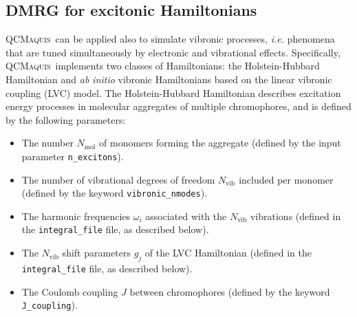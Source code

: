\documentclass[bibliography=totoc,12pt,a4paper]{scrartcl}
\newcommand{\qcm}{\textsc{QCMaquis}}
\begin{document}
%
%

\subsection{DMRG for excitonic Hamiltonians}
\label{sec:excitonic}

\qcm\ can be applied also to simulate vibronic processes, \textit{i.e.} phenomena that are tuned simultaneously by electronic and vibrational effects.
Specifically, \qcm\ implements two classes of Hamiltonians: the Holstein-Hubbard Hamiltonian and \textit{ab initio} vibronic Hamiltonians based on the linear vibronic coupling (LVC) model.
The Holstein-Hubbard Hamiltonian describes excitation energy processes in molecular aggregates of multiple chromophores, and is defined by the following parameters:

\begin{itemize}
  \item The number $N_\text{mol}$ of monomers forming the aggregate (defined by the input parameter \texttt{n\_excitons}).
  \item The number of vibrational degrees of freedom $N_\text{vib}$ included per monomer (defined by the keyword \texttt{vibronic\_nmodes}).
  \item The harmonic frequencies $\omega_i$ associated with the $N_\text{vib}$ vibrations (defined in the \texttt{integral\_file} file, as described below).
  \item The $N_\text{vib}$ shift parameters $g_j$ of the LVC Hamiltonian (defined in the \texttt{integral\_file} file, as described below).
  \item The Coulomb coupling $J$ between chromophores (defined by the keyword \texttt{J\_coupling}).
\end{itemize}
\end{document}
